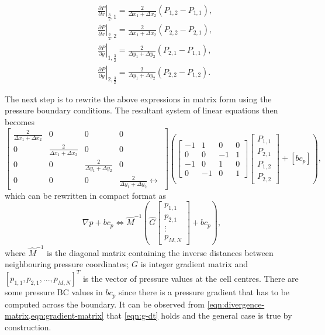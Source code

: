 \documentclass{article}
\numberwithin{equation}{section}
\begin{document}
\begin{equation}
\begin{aligned}
& \left.\frac{\partial P}{\partial x}\right|_{\frac{3}{2}, 1}=\frac{2}{\Delta x_1+\Delta x_2}\left(P_{1,2}-P_{1,1}\right), \\
& \left.\frac{\partial P}{\partial x}\right|_{\frac{3}{2}, 2}=\frac{2}{\Delta x_1+\Delta x_2}\left(P_{2,2}-P_{2,1}\right), \\
& \left.\frac{\partial P}{\partial y}\right|_{1, \frac{3}{2}}=\frac{2}{\Delta y_1+\Delta y_2}\left(P_{2,1}-P_{1,1}\right), \\
& \left.\frac{\partial P}{\partial y}\right|_{2, \frac{3}{2}}=\frac{2}{\Delta y_1+\Delta y_2}\left(P_{2,2}-P_{1,2}\right) .
\end{aligned}
\end{equation}

The next step is to rewrite the above expressions in matrix form using the pressure boundary conditions. The resultant system of linear equations then becomes
\begin{equation}\label{eqn:gradient-matrix}
\left[\begin{array}{cccc}
\frac{2}{\Delta x_1+\Delta x_2} & 0 & 0 & 0 \\
0 & \frac{2}{\Delta x_1+\Delta x_2} & 0 & 0 \\
0 & 0 & \frac{2}{\Delta y_1+\Delta y_2} & 0 \\
0 & 0 & 0 & \frac{2}{\Delta y_1+\Delta y_2}
\leftrightarrow\end{array}\right]
\left(\left[\begin{array}{rrrr}
-1 & 1 & 0 & 0 \\
0 & 0 & -1 & 1 \\
-1 & 0 & 1 & 0 \\
0 & -1 & 0 & 1
\end{array}\right]\left[\begin{array}{l}
P_{1,1} \\
P_{2,1} \\
P_{1,2} \\
P_{2,2}
\end{array}\right]
+
\left[bc_p\right]\right),
\end{equation}
which can be rewritten in compact format as
$$
\nabla p+b c_p \Longleftrightarrow 
\hat{M}^{-1} \left(\hat{G}\left[\begin{array}{c}
p_{1,1} \\
p_{2,1} \\
\vdots \\
p_{M,N}
\end{array}\right]+bc_p\right),
$$
where $\hat{M}^{-1}$ is the diagonal matrix containing the inverse distances between neighbouring pressure coordinates; ${G}$ is integer gradient matrix and $[p_{1,1},p_{2,1},...,p_{M,N}]^T$ is the vector of pressure values at the cell centres. There are some pressure BC values in ${bc}_p$ since there is a pressure gradient that has to be computed across the boundary. It can be observed from \cref{eqn:divergence-matrix,eqn:gradient-matrix} that \cref{eqn:g-dt} holds and the general case is true by construction. 
\end{document}
